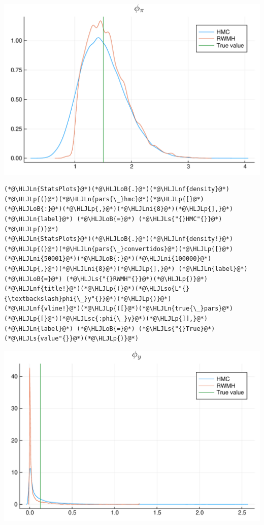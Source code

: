 \documentclass[12pt,a4paper]{article}
\newcommand{\HLJLn}[1]{#1}
\newcommand{\HLJLnf}[1]{\textcolor[RGB]{66,102,213}{#1}}
\newcommand{\HLJLs}[1]{\textcolor[RGB]{201,61,57}{#1}}
\newcommand{\HLJLsc}[1]{\textcolor[RGB]{201,61,57}{#1}}
\newcommand{\HLJLso}[1]{\textcolor[RGB]{201,61,57}{#1}}
\newcommand{\HLJLni}[1]{\textcolor[RGB]{59,151,46}{#1}}
\newcommand{\HLJLoB}[1]{\textcolor[RGB]{102,102,102}{\textbf{#1}}}
\newcommand{\HLJLp}[1]{#1}
\begin{document}
\includegraphics[width=\linewidth]{figures/dsge_and_julia_50_1.pdf}

\begin{lstlisting}
(*@\HLJLn{StatsPlots}@*)(*@\HLJLoB{.}@*)(*@\HLJLnf{density}@*)(*@\HLJLp{(}@*)(*@\HLJLn{pars{\_}hmc}@*)(*@\HLJLp{[}@*)(*@\HLJLoB{:}@*)(*@\HLJLp{,}@*)(*@\HLJLni{8}@*)(*@\HLJLp{],}@*) (*@\HLJLn{label}@*) (*@\HLJLoB{=}@*) (*@\HLJLs{"{}HMC"{}}@*)(*@\HLJLp{)}@*)
(*@\HLJLn{StatsPlots}@*)(*@\HLJLoB{.}@*)(*@\HLJLnf{density!}@*)(*@\HLJLp{(}@*)(*@\HLJLn{pars{\_}convertidos}@*)(*@\HLJLp{[}@*)(*@\HLJLni{50001}@*)(*@\HLJLoB{:}@*)(*@\HLJLni{100000}@*)(*@\HLJLp{,}@*)(*@\HLJLni{8}@*)(*@\HLJLp{],}@*) (*@\HLJLn{label}@*) (*@\HLJLoB{=}@*) (*@\HLJLs{"{}RWMH"{}}@*)(*@\HLJLp{)}@*)
(*@\HLJLnf{title!}@*)(*@\HLJLp{(}@*)(*@\HLJLso{L"{}{\textbackslash}phi{\_}y"{}}@*)(*@\HLJLp{)}@*)
(*@\HLJLnf{vline!}@*)(*@\HLJLp{([}@*)(*@\HLJLn{true{\_}pars}@*)(*@\HLJLp{[}@*)(*@\HLJLsc{:phi{\_}y}@*)(*@\HLJLp{]],}@*) (*@\HLJLn{label}@*) (*@\HLJLoB{=}@*) (*@\HLJLs{"{}True}@*) (*@\HLJLs{value"{}}@*)(*@\HLJLp{)}@*)
\end{lstlisting}

\includegraphics[width=\linewidth]{figures/dsge_and_julia_51_1.pdf}
\end{document}

